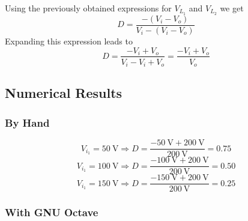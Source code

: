 Using the previously obtained expressions for $V_{L_{1}}$ and
$V_{L_{2}}$ we get
\[  D = \frac{-(V_i - V_o)}{V_i - (V_i - V_o)} \]
Expanding this expression leads to
\[ D = \frac{- V_i + V_o}{V_i - V_i + V_o} = \frac{- V_i + V_o}{V_o} \]

\subsection{Numerical Results}

\subsubsection{By Hand}
\[ V_{i_{1}} = \SI{50}{\volt}  \Rightarrow D = \frac{- \SI{50}{\volt}  + \SI{200}{\volt}}{\SI{200}{\volt}}  = 0.75 \]
\[ V_{i_{1}} = \SI{100}{\volt} \Rightarrow D = \frac{- \SI{100}{\volt} + \SI{200}{\volt}}{\SI{200}{\volt}} = 0.50 \]
\[ V_{i_{1}} = \SI{150}{\volt} \Rightarrow D = \frac{- \SI{150}{\volt} + \SI{200}{\volt}}{\SI{200}{\volt}} = 0.25 \]

\subsubsection{With GNU Octave}


%
%
